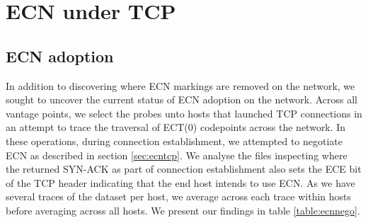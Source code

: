 \documentclass{l4proj}
\begin{document}
\section{ECN under TCP}

\subsection{ECN adoption}

In addition to discovering where ECN markings are removed on the network, we sought to uncover the current status of ECN adoption on the network. Across all vantage points, we select the probes unto hosts that launched TCP connections in an attempt to trace the traversal of ECT(0) codepoints across the network. In these operations, during connection establishment, we attempted to negotiate ECN as described in section \ref{sec:ecntcp}. We analyse the files inspecting where the returned SYN-ACK as part of connection establishment also sets the ECE bit of the TCP header indicating that the end host intends to use ECN. As we have several traces of the dataset per host, we average across each trace within hosts before averaging across all hosts. We present our findings in table \ref{table:ecnnego}.

\begin{table}[H]
\centering

\caption{Percentage of hosts willing to negotiate ECN by Host sample and IP version utilised. We notice no appreciable difference in ECN adoption between host samples, and a slight increase between IPv4 hosts to IPv6 hosts of the same host sample.}
\label{table:ecnnego}
\end{table}
\end{document}
